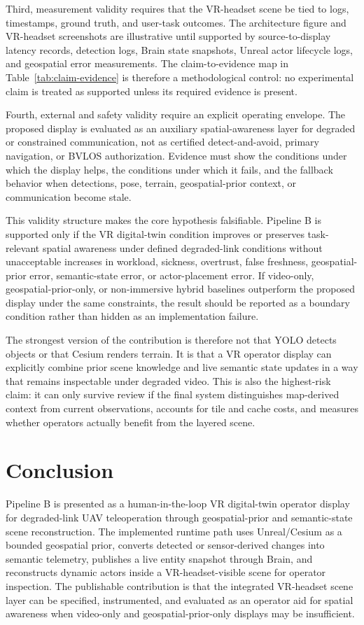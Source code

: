 \documentclass[fleqn]{VRIH2025}
\begin{document}
Third, measurement validity requires that the VR-headset scene be tied to logs, timestamps, ground truth, and user-task outcomes. The architecture figure and VR-headset screenshots are illustrative until supported by source-to-display latency records, detection logs, Brain state snapshots, Unreal actor lifecycle logs, and geospatial error measurements. The claim-to-evidence map in Table~\ref{tab:claim-evidence} is therefore a methodological control: no experimental claim is treated as supported unless its required evidence is present.

Fourth, external and safety validity require an explicit operating envelope. The proposed display is evaluated as an auxiliary spatial-awareness layer for degraded or constrained communication, not as certified detect-and-avoid, primary navigation, or BVLOS authorization. Evidence must show the conditions under which the display helps, the conditions under which it fails, and the fallback behavior when detections, pose, terrain, geospatial-prior context, or communication become stale.

This validity structure makes the core hypothesis falsifiable. Pipeline B is supported only if the VR digital-twin condition improves or preserves task-relevant spatial awareness under defined degraded-link conditions without unacceptable increases in workload, sickness, overtrust, false freshness, geospatial-prior error, semantic-state error, or actor-placement error. If video-only, geospatial-prior-only, or non-immersive hybrid baselines outperform the proposed display under the same constraints, the result should be reported as a boundary condition rather than hidden as an implementation failure.

The strongest version of the contribution is therefore not that YOLO detects objects or that Cesium renders terrain. It is that a VR operator display can explicitly combine prior scene knowledge and live semantic state updates in a way that remains inspectable under degraded video. This is also the highest-risk claim: it can only survive review if the final system distinguishes map-derived context from current observations, accounts for tile and cache costs, and measures whether operators actually benefit from the layered scene.

\section{Conclusion}

Pipeline B is presented as a human-in-the-loop VR digital-twin operator display for degraded-link UAV teleoperation through geospatial-prior and semantic-state scene reconstruction. The implemented runtime path uses Unreal/Cesium as a bounded geospatial prior, converts detected or sensor-derived changes into semantic telemetry, publishes a live entity snapshot through Brain, and reconstructs dynamic actors inside a VR-headset-visible scene for operator inspection. The publishable contribution is that the integrated VR-headset scene layer can be specified, instrumented, and evaluated as an operator aid for spatial awareness when video-only and geospatial-prior-only displays may be insufficient.
\end{document}
